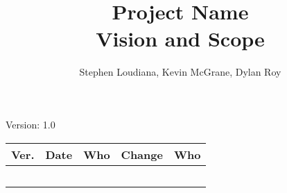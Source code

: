 \documentclass[letterpaper,12pt]{article}
\title{Project Name\\Vision and Scope}
\author{Stephen Loudiana, Kevin McGrane, Dylan Roy}
\begin{document}
\maketitle

\begin{center}
  Version: 1.0
\end{center}

\vfill
\begin{tabularx}{\linewidth}{|l|l|l|X|l|}\hline
Ver. & Date & Who & Change & Who \\\hline
     &      &     &        &     \\\hline
     &      &     &        &     \\\hline
     &      &     &        &     \\\hline
     &      &     &        &     \\\hline
     &      &     &        &     \\\hline
\end{tabularx}
\newpage







\end{document}
